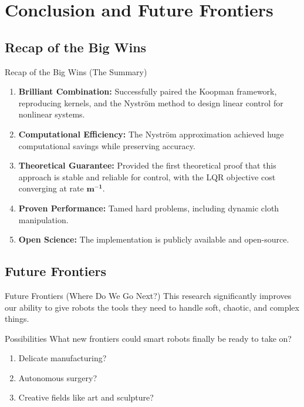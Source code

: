 \documentclass{beamer}
\begin{document}
\section{Conclusion and Future Frontiers}

\subsection{Recap of the Big Wins}
\begin{frame}{Recap of the Big Wins (The Summary)}
    \begin{enumerate}
        \item \textbf{Brilliant Combination:} Successfully paired the Koopman framework, reproducing kernels, and the Nyström method to design linear control for nonlinear systems.
        \item \textbf{Computational Efficiency:} The Nyström approximation achieved huge computational savings while preserving accuracy.
        \item \textbf{Theoretical Guarantee:} Provided the first theoretical proof that this approach is stable and reliable for control, with the LQR objective cost converging at rate $\mathbf{m^{-1}}$.
        \item \textbf{Proven Performance:} Tamed hard problems, including dynamic cloth manipulation.
        \item \textbf{Open Science:} The implementation is publicly available and open-source.
    \end{enumerate}
\end{frame}

\subsection{Future Frontiers}
\begin{frame}{Future Frontiers (Where Do We Go Next?)}
    This research significantly improves our ability to give robots the tools they need to handle soft, chaotic, and complex things.
    \begin{block}{Possibilities}
    What new frontiers could smart robots finally be ready to take on?
    \begin{enumerate}
        \item Delicate manufacturing?
        \item Autonomous surgery?
        \item Creative fields like art and sculpture?
    \end{enumerate}
    \end{block}
\end{frame}
\end{document}
